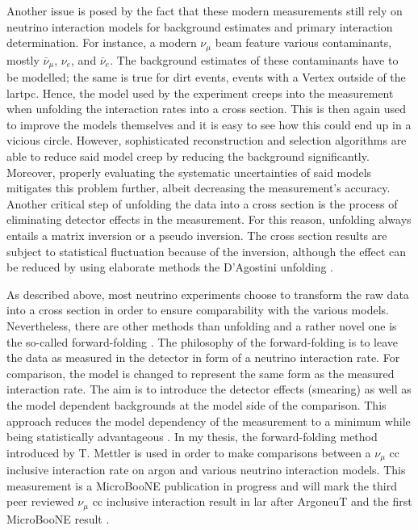 Another issue is posed by the fact that these modern measurements still rely on neutrino interaction models for background estimates and primary interaction determination. For instance, a modern $\nu_{\mu}$ beam feature various contaminants, mostly $\bar{\nu}_\mu$, $\nu_e$, and $\bar{\nu}_e$. The background estimates of these contaminants have to be modelled; the same is true for dirt events, \ie events with a \gls{Vertex} outside of the \gls{lartpc}. Hence, the model used by the experiment creeps into the measurement when unfolding the interaction rates into a cross section. This is then again used to improve the models themselves and it is easy to see how this could end up in a vicious circle. However, sophisticated reconstruction and selection algorithms are able to reduce said model creep by reducing the background significantly. Moreover, properly evaluating the systematic uncertainties of said models mitigates this problem further, albeit decreasing the measurement's accuracy. Another critical step of unfolding the data into a cross section is the process of eliminating detector effects in the measurement. For this reason, unfolding always entails a matrix inversion or a pseudo inversion. The cross section results are subject to statistical fluctuation because of the inversion, although the effect can be reduced by using elaborate methods the D'Agostini unfolding \cite{DAgostiniUnfolding}.

As described above, most neutrino experiments choose to transform the raw data into a cross section in order to ensure comparability with the various models. Nevertheless, there are other methods than unfolding and a rather novel one is the so-called forward-folding \cite{ForwardFoldingIdea}. The philosophy of the forward-folding is to leave the data as measured in the detector in form of a neutrino interaction rate. For comparison, the model is changed to represent the same form as the measured interaction rate. The aim is to introduce the detector effects (smearing) as well as the model dependent backgrounds at the model side of the comparison. This approach reduces the model dependency of the measurement to a minimum while being statistically advantageous \cite{ForwardFolding}. In my thesis, the forward-folding method introduced by T. Mettler \cite{CRTThomasPhD} is used in order to make comparisons between a $\nu_\mu$ \gls{cc} inclusive interaction rate on argon and various neutrino interaction models. This measurement is a MicroBooNE publication in progress and will mark the third peer reviewed $\nu_\mu$ \gls{cc} inclusive interaction result in \gls{lar} after ArgoneuT \cite{ArgoneutFirstCCInclusive} and the first MicroBooNE result \cite{MicroBooNEFirstCCInclPublished}.

